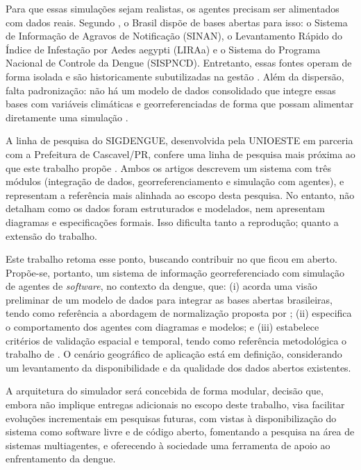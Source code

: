 
Para que essas simulações sejam realistas, os agentes precisam ser alimentados com
dados reais. Segundo , o Brasil dispõe de bases abertas para isso: o Sistema de Informação de Agravos
de Notificação (SINAN), o Levantamento Rápido do Índice de Infestação por Aedes
aegypti (LIRAa) e o Sistema do Programa Nacional de Controle da Dengue (SISPNCD).
Entretanto, essas fontes operam de forma isolada e são historicamente subutilizadas
na gestão \cite{rizzi2016}. Além da dispersão, falta padronização: não há um modelo
de dados consolidado que integre essas bases com variáveis climáticas e georreferenciadas
de forma que possam alimentar diretamente uma simulação \cite{moreira2025}.

A linha de pesquisa do SIGDENGUE, desenvolvida pela UNIOESTE em parceria
com a Prefeitura de Cascavel/PR, confere uma linha de pesquisa mais próxima ao que este trabalho
propõe \cite{rizzi2011, rizzi2016}. Ambos os artigos descrevem um sistema
com três módulos (integração de dados, georreferenciamento e simulação com agentes),
e representam a referência mais alinhada ao escopo desta pesquisa. No entanto, não detalham
como os dados foram estruturados e modelados, nem apresentam diagramas e
especificações formais. Isso dificulta tanto a reprodução; quanto a extensão do trabalho.


Este trabalho retoma esse ponto, buscando contribuir no que ficou em
aberto. Propõe-se, portanto, um sistema de informação georreferenciado com simulação de
agentes de \textit{software}, no contexto da dengue, que: (i) acorda uma visão preliminar de um modelo de dados
para integrar as bases abertas brasileiras, tendo como referência a abordagem de normalização 
proposta por \cite{moreira2025}; (ii) especifica o comportamento dos agentes com
diagramas e modelos; e (iii) estabelece critérios de validação espacial e temporal, tendo
como referência metodológica o trabalho de \cite{li2016}. O cenário geográfico de
aplicação está em definição, considerando um levantamento da disponibilidade e da qualidade dos
dados abertos existentes.

A arquitetura do simulador será concebida de forma modular, decisão que, embora
não implique entregas adicionais no escopo deste trabalho, visa facilitar evoluções
incrementais em pesquisas futuras, com vistas à disponibilização do sistema como software
livre e de código aberto, fomentando a pesquisa na área de sistemas multiagentes, e
oferecendo à sociedade uma ferramenta de apoio ao enfrentamento da dengue.

